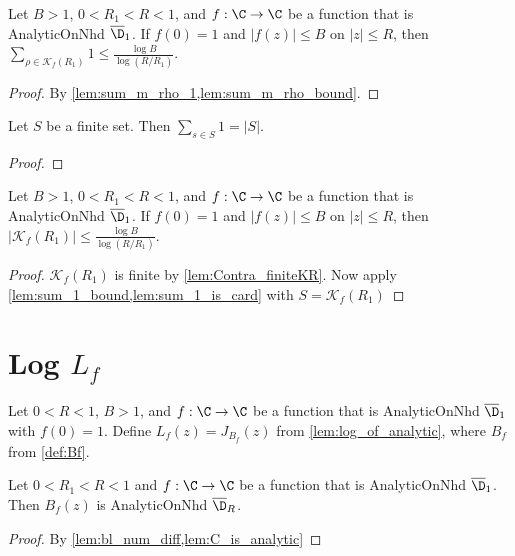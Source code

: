 \begin{lemma}\label{lem:sum_1_bound}  \leanok
Let $B>1$, $0<R_1<R<1$, and $f:\C\to\C$ be a function that is AnalyticOnNhd $\overline{\D}_1$. If $f(0)=1$ and $|f(z)|\le B$ on $|z|\le R$, then $\sum_{\rho\in\mathcal K_f(R_1)} 1 \le \frac{\log B}{\log(R/R_1)}$.
\end{lemma}
\begin{proof}
\leanok
By \cref{lem:sum_m_rho_1,lem:sum_m_rho_bound}.
\end{proof}

\begin{lemma}\label{lem:sum_1_is_card}  \leanok
Let $S$ be a finite set. Then $\sum_{s \in S} 1 = |S|$.
\end{lemma}
\begin{proof} \leanok
\end{proof}

\begin{lemma}\label{lem:num_zeros_bound}  \leanok
Let $B>1$, $0<R_1<R<1$, and $f:\C\to\C$ be a function that is AnalyticOnNhd $\overline{\D}_1$. If $f(0)=1$ and $|f(z)|\le B$ on $|z|\le R$, then $|\mathcal K_f(R_1)| \le \frac{\log B}{\log(R/R_1)}$.
\end{lemma}
\begin{proof}
\leanok
$\mathcal K_f(R_1)$ is finite by \cref{lem:Contra_finiteKR}.
Now apply \cref{lem:sum_1_bound,lem:sum_1_is_card} with $S=\mathcal K_f(R_1)$
\end{proof}


\section{Log $L_f$}


\begin{definition}\label{def:Lf}\leanok
{}
Let $0<R<1$, $B>1$, and $f:\C\to\C$ be a function that is AnalyticOnNhd $\overline{\D}_1$ with $f(0)=1$. Define $L_f(z) = J_{B_f}(z)$ from \cref{lem:log_of_analytic}, where $B_f$ from \cref{def:Bf}.
\end{definition}


\begin{lemma}\label{lem:Bf_is_analytic_on_disk}  \leanok
Let $0<R_1<R<1$ and $f:\C\to\C$ be a function that is AnalyticOnNhd $\overline{\D}_1$. Then $B_f(z)$ is AnalyticOnNhd $\overline{\D}_R$.
\end{lemma}
\begin{proof}
\leanok
By \cref{lem:bl_num_diff,lem:C_is_analytic}
\end{proof}

